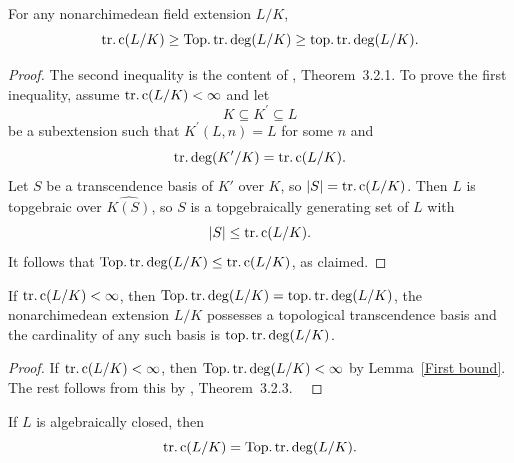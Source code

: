 \begin{lemma}\label{First bound}For any nonarchimedean field extension $L/K$, \begin{equation*}\operatorname{tr.c}(L/K)\geq \operatorname{Top.tr.deg}(L/K)\geq \operatorname{top.tr.deg}(L/K).
\end{equation*}
\end{lemma}
\begin{proof}The second inequality is the content of \cite{Temkin21}, Theorem~3.2.1. To prove the first inequality, assume $\operatorname{tr.c}(L/K)<\infty$ and let \begin{equation*}K\subseteq K^{\prime}\subseteq L\end{equation*}be a subextension such that $K^{\prime}(L,n)=L$ for some $n$ and \begin{equation*}\operatorname{tr.deg}(K^{\prime}/K)=\operatorname{tr.c}(L/K).\end{equation*}
Let $S$ be a transcendence basis of $K'$ over $K$, so $\vert S\vert=\operatorname{tr.c}(L/K)$. Then $L$ is topgebraic over $\widehat{K(S)}$, so $S$ is a topgebraically generating set of $L$ with \begin{equation*}\vert S\vert\leq \operatorname{tr.c}(L/K).\end{equation*}It follows that $\operatorname{Top.tr.deg}(L/K)\leq \operatorname{tr.c}(L/K)$, as claimed.
\end{proof}
\begin{cor}\label{First equality}If $\operatorname{tr.c}(L/K)<\infty$, then $\operatorname{Top.tr.deg}(L/K)=\operatorname{top.tr.deg}(L/K)$, the nonarchimedean extension $L/K$ possesses a topological transcendence basis and the cardinality of any such basis is $\operatorname{top.tr.deg}(L/K)$. \end{cor}
\begin{proof}If $\operatorname{tr.c}(L/K)<\infty$, then $\operatorname{Top.tr.deg}(L/K)<\infty$ by Lemma~\ref{First bound}. The rest follows from this by \cite{Temkin21}, Theorem~3.2.3.  
\end{proof} 
\begin{lemma}\label{Algebraically closed}
If $L$ is algebraically closed, then
\begin{equation*}
\operatorname{tr.c}(L/K)=\operatorname{Top.tr.deg}(L/K).
\end{equation*}
\end{lemma}
